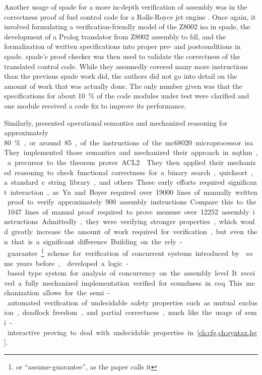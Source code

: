 Another usage of \ac{spade} for a more in-depth verification of assembly
was in the correctness proof of fuel control code for a Rolls-Royce
jet engine \autocite{oneill1988verification}. Once again,
it involved formulating a verification-friendly model of the Z8002 \ac{isa}
in \ac{spade}, the development of a Prolog translator from Z8002 assembly to \ac{fdl},
and the formalization of written specifications into proper pre- and postconditions
in \ac{spade}. \Ac{spade}'s proof checker was then used to validate the correctness
of the translated control code. While they assumedly covered many more instructions
than the previous \ac{spade} work did, the authors did not go into detail
on the amount of work that was actually done.
The only number given was that the specifications for about \SI{10}{\percent}
of the code modules under test were clarified
and one module received a code fix to improve its performance.

Similarly, \textcite{yu1993automated,boyer1996automated}
presented operational semantics and mechanized reasoning
for approximately \SI{80}\percent, or around \num{85}, of the instructions of the \gls{mc68020} microprocessor \ac{isa}.
They implemented those semantics and mechanized their approach
in \ac{nqthm}, a precursor to the theorem prover ACL2 \autocite{ACL2}.
They then applied their mechanized reasoning to check functional correctness
for a binary search, quicksort, a standard \gls{c} string library, and others.
These early efforts required significant interaction,
as Yu and Boyer required over \num{19000}
lines of manually written proof to verify approximately \num{900} assembly instructions.
Compare this to the \num{1047} lines of manual proof
required to prove \gls{memuse} over \num{12252} assembly instructions.
Admittedly, they were verifying stronger properties,
which would greatly increase the amount of work required for verification,
but even then that is a significant difference.

Building on the rely-guarantee\footnote{or ``assume-guarantee'', as the paper calls it} scheme for verification of concurrent systems introduced by \textcite{xu1997rely-guarantee} some years before,
\textcite{yu2004concurrent} developed a logic-based type system for analysis of concurrency on the assembly level.
It received a fully mechanized implementation verified for soundness in \gls{coq}.
This mechanization allows for the semi-automated verification of undecidable safety properties such as mutual exclusion, deadlock freedom, and partial correctness, much like the usage of semi-interactive proving to deal with undecidable properties in \cref{ch:cfg,ch:syntax,hg}.

